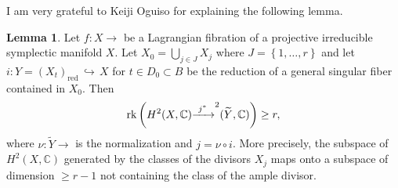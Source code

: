 \documentclass[a4paper,11pt,final]{amsart}
\theoremstyle{plain}
\theoremstyle{definition}
\newtheorem{lemma}[subsection]{Lemma}
\numberwithin{equation}{section}
\theoremstyle{remark}
\begin{document}
I am very grateful to Keiji Oguiso for explaining the following lemma.
\begin{lemma}\label{lemma codim}
Let $f:X{\xrightarrow{\ \ }}$ be a Lagrangian fibration of a projective irreducible symplectic manifold $X$. Let $X_0=\bigcup_{j\in J} X_j$ where $J=\left\{1, \ldots, r\right\}$ and let $i:Y=\left(X_t\right)_{{\operatorname{red}}} {{\, \hookrightarrow\,}} X$ for $t\in D_0 \subset B$ be the reduction of a general singular fiber contained in $X_0$. Then 
\[
{{\rm rk}}\left(H^2(X,{{\mathbb C}}){\xrightarrow{\ j^*\ }}^2({{\widetilde{Y}}},{{\mathbb C}})\right)\geq r,
\]
where $\nu:{{\widetilde{Y}}}{\xrightarrow{\ \ }}$ is the normalization and $j = \nu \circ i$. More precisely, the subspace of $H^2(X,{{\mathbb C}})$ generated by the classes of the divisors $X_j$ maps onto a subspace of dimension $\geq r-1$ not containing the class of the ample divisor.
\end{lemma}
\end{document}
